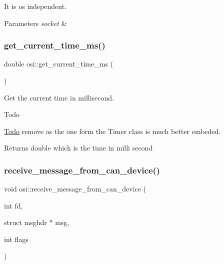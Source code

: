 It is os independent.


\begin{DoxyParams}{Parameters}
{\em socket} & \\
\hline
\end{DoxyParams}
\mbox{\label{namespaceosi_a2409ab591c4f78d9a8bcfbbe38df9429}} 
\subsubsection{\texorpdfstring{get\+\_\+current\+\_\+time\+\_\+ms()}{get\_current\_time\_ms()}}
{\footnotesize\ttfamily double osi\+::get\+\_\+current\+\_\+time\+\_\+ms (\begin{DoxyParamCaption}{ }\end{DoxyParamCaption})\hspace{0.3cm}{\ttfamily [inline]}}



Get the current time in millisecond. 

\begin{DoxyRefDesc}{Todo}
\item[\hyperlink{todo__todo000006}{Todo}]remove as the one form the Timer class is much better embeded.\end{DoxyRefDesc}


\begin{DoxyReturn}{Returns}
double which is the time in milli second 
\end{DoxyReturn}
\mbox{\label{namespaceosi_a244466c0afc9ae9fe059cee665fb0603}} 
\subsubsection{\texorpdfstring{receive\+\_\+message\+\_\+from\+\_\+can\+\_\+device()}{receive\_message\_from\_can\_device()}}
{\footnotesize\ttfamily void osi\+::receive\+\_\+message\+\_\+from\+\_\+can\+\_\+device (\begin{DoxyParamCaption}\item[{int}]{fd,  }\item[{struct msghdr $\ast$}]{msg,  }\item[{int}]{flags }\end{DoxyParamCaption})\hspace{0.3cm}{\ttfamily [inline]}}



